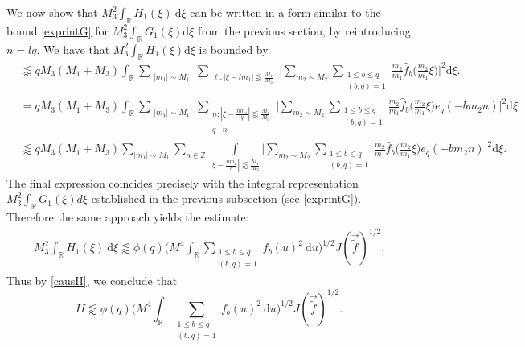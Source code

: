 \documentclass[12pt]{amsart}
\theoremstyle{definition}
\theoremstyle{plain}
\theoremstyle{remark}
\numberwithin{equation}{section}
\numberwithin{theorem}{section}
\numberwithin{equation}{section}
\begin{document}
	We now show that $M_{3}^{2}\int_{\mathbb{R}}H_{1}(\xi)\: \mathrm{d} \xi$ can be written in a form similar to the bound \eqref{exprintG} for $M_3^2 \int_{\mathbb{R}} G_1(\xi) \mathrm{d} \xi$ from the previous section, by reintroducing $n=lq$. We have that $M_3^2 \int_{\mathbb{R}}H_1(\xi) \mathrm{d} \xi$ is bounded by 
	\begin{align*}
		&\lessapprox  qM_3(M_1+M_3)\int_{\mathbb{R}} \sum_{\substack{|m_1|\sim M_1}} \sum_{\substack{\ell : |\xi-lm_1| \lessapprox \frac{M_1}{M_3} \\ }} \bigg|\sum_{m_2 \sim M_2}\sum_{\substack{1 \leq b \leq q \\ (b,q)=1}} \frac{m_2}{m_1} \hat{f}_b \bigg(\frac{m_2}{m_1}\xi\bigg)\bigg|^2 \mathrm{d}\xi.
		\\
		&=   qM_3(M_1+M_3)\int_{\mathbb{R}} \sum_{\substack{|m_1|\sim M_1}} \sum_{\substack{n : |\xi-\frac{nm_1}{q}| \lessapprox \frac{M_1}{M_3} \\ q \mid n }} \bigg|\sum_{m_2 \sim M_2}\sum_{\substack{1 \leq b \leq q \\ (b,q)=1}} \frac{m_2}{m_1} \hat{f}_b \bigg(\frac{m_2}{m_1}\xi\bigg) e_q({-bm_{2}n})\bigg|^2 \mathrm{d}\xi
		\\
		&\lessapprox
		qM_{3}(M_{1}+M_{3})
		\sum_{|m_{1}|\sim M_{1}}\sum_{n \in \mathbb{Z}}
		\int\limits_{|\xi - \frac{nm_{1}}{q}|\lessapprox \frac{M_{1}}{M_{3}}}
		\Biggl|\sum_{m_{2}\sim M_{2}}
		\sum_{\substack{1 \leq b \leq q \\ (b, q)=1}}\frac{m_{2}}{m_{1}}\hat{f}_{b}\bigg(\frac{m_{2}}{m_{1}}\xi\bigg)
		e_q({-bm_{2}n})\Biggl|^{2} \mathrm{d} \xi.
	\end{align*}
	The final expression coincides precisely with the integral representation $M_3^2 \int_{\mathbb{R}} G_1(\xi) d\xi$ established in the previous subsection (see \eqref{exprintG}). Therefore the same approach yields the estimate:
	\begin{align*}
		M_{3}^{2}\int_{\mathbb{R}}H_{1}(\xi)\: \mathrm{d} \xi 
		\lessapprox \phi(q) \bigg(M^{4}\int_{\mathbb{R}}\sum_{\substack{1 \leq b \leq q \\ (b, q)=1}}f_{b}(u)^{2}\:\mathrm{d}u\bigg)^{1/2}J(\overrightarrow{\tilde{f}})^{1/2}.
	\end{align*}
	Thus by \eqref{causII}, we conclude that
	\begin{equation}\label{conII}
		II \lessapprox \phi(q) \bigg(M^{4}\int_{\mathbb{R}}\sum_{\substack{1 \leq b \leq q \\ (b, q)=1}}f_{b}(u)^{2}\:\mathrm{d}u\bigg)^{1/2}J(\overrightarrow{\tilde{f}})^{1/2}.
	\end{equation}
	
\end{document}
